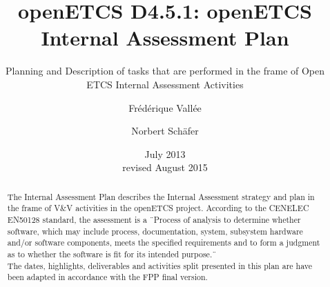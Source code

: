 \documentclass[openetcs]{template/openetcs_article}
\begin{document}
\frontmatter
{}




\title{openETCS D4.5.1: openETCS Internal Assessment Plan}

\subtitle{Planning and Description of tasks that are performed in the frame of Open ETCS Internal Assessment Activities}

\date{July 2013\\revised August 2015}







\author{Fr\'ed\'erique Vall\'ee}


\author{Norbert Sch\"afer}









\begin{abstract}
The Internal Assessment Plan describes the Internal Assessment strategy and plan in the frame of V\&V activities in the openETCS \cite{openETCS} project.
According to the CENELEC EN50128 \cite{EN50128} standard, the assessment is a \"\ Process of analysis to determine whether software, which may include
process, documentation, system, subsystem hardware and/or software components, meets the specified requirements and to form a judgment as to whether the
software is fit for its intended purpose.\"\
\\
The dates, highlights, deliverables and activities split presented in this plan are have been adapted in accordance with the FPP \cite{FPP} final version.
\end{abstract}
\end{document}
